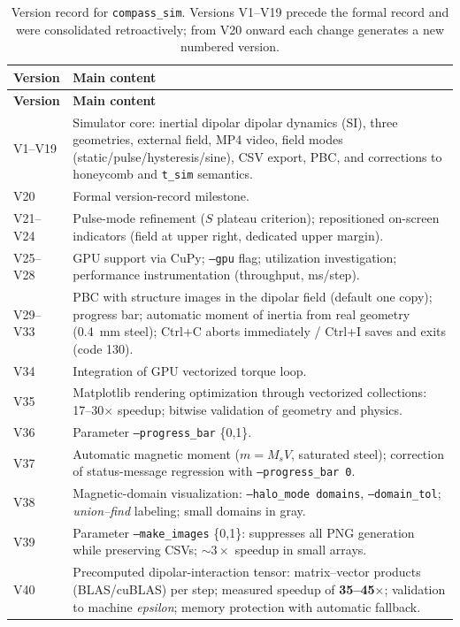 \documentclass[11pt,a4paper]{article}
\newcommand{\code}[1]{\texttt{#1}}
\begin{document}
\begin{longtable}{@{}lp{11.5cm}@{}}
\caption{Version record for \code{compass\_sim}. Versions V1--V19 precede the formal record and were consolidated retroactively; from V20 onward each change generates a new numbered version.}
\label{tab:versions} \\
\toprule
\textbf{Version} & \textbf{Main content} \\
\midrule
\endfirsthead
\toprule
\textbf{Version} & \textbf{Main content} \\
\midrule
\endhead
\bottomrule
\endfoot
\bottomrule
\endlastfoot
V1--V19 & Simulator core: inertial dipolar dipolar dynamics (SI), three geometries, external field, MP4 video, field modes (static/pulse/hysteresis/sine), CSV export, PBC, and corrections to honeycomb and \code{t\_sim} semantics. \\
V20 & Formal version-record milestone. \\
V21--V24 & Pulse-mode refinement ($S$ plateau criterion); repositioned on-screen indicators (field at upper right, dedicated upper margin). \\
V25--V28 & GPU support via CuPy; \code{--gpu} flag; utilization investigation; performance instrumentation (throughput, ms/step). \\
V29--V33 & PBC with structure images in the dipolar field (default one copy); progress bar; automatic moment of inertia from real geometry (\SI{0.4}{mm} steel); Ctrl+C aborts immediately / Ctrl+I saves and exits (code 130). \\
V34 & Integration of GPU vectorized torque loop. \\
V35 & Matplotlib rendering optimization through vectorized collections: 17--30$\times$ speedup; bitwise validation of geometry and physics. \\
V36 & Parameter \code{--progress\_bar} \{0,1\}. \\
V37 & Automatic magnetic moment ($m = M_s V$, saturated steel); correction of status-message regression with \code{--progress\_bar 0}. \\
V38 & Magnetic-domain visualization: \code{--halo\_mode domains}, \code{--domain\_tol}; \emph{union--find} labeling; small domains in gray. \\
V39 & Parameter \code{--make\_images} \{0,1\}: suppresses all PNG generation while preserving CSVs; $\sim 3\times$ speedup in small arrays. \\
V40 & Precomputed dipolar-interaction tensor: matrix--vector products (BLAS/cuBLAS) per step; measured speedup of \textbf{35--45$\times$}; validation to machine \emph{epsilon}; memory protection with automatic fallback. \\

\end{longtable}
\end{document}
